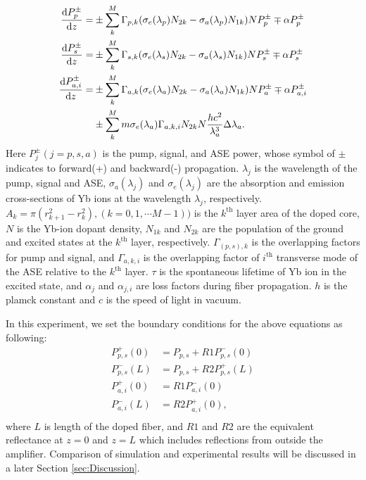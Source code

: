 \documentclass{osa-article}
\begin{document}
\begin{align}
  \dv{P^{\pm}_{p}}{z} = &\pm \sum_{k}^{M} \Gamma_{p, k} (\sigma_{e}(\lambda_{p})N_{2k} - \sigma_{a}(\lambda_{p})N_{1k})NP^{\pm}_{p} \mp \alpha P^{\pm}_{p} \label{eq:PumpPropagationEquation}\\
  \dv{P^{\pm}_{s}}{z} = &\pm \sum_{k}^{M} \Gamma_{s, k} (\sigma_{e}(\lambda_{s})N_{2k} - \sigma_{a}(\lambda_{s})N_{1k})NP^{\pm}_{s} \mp \alpha P^{\pm}_{s} \label{eq:SignalPropagationEquation}\\
  \dv{P^{\pm}_{a, i}}{z} = &\pm \sum_{k}^{M} \Gamma_{a, k} (\sigma_{e}(\lambda_{a})N_{2k} - \sigma_{a}(\lambda_{a})N_{1k})NP^{\pm}_{a} \mp \alpha P^{\pm}_{a, i}\\
  &\pm \sum_{k}^{M} m\sigma_{e}(\lambda_{a})\Gamma_{a, k, i} N_{2k}N \frac{hc^{2}}{\lambda_{a}^{3}} \Delta\lambda_{a}. \label{eq:ASEPropagationEquation}
\end{align}
Here $P^{\pm}_{j} (j = p, s, a)$ is the pump, signal, and ASE power, whose symbol of $\pm$ indicates to forward(+) and backward(-) propagation.
$\lambda_{j}$ is the wavelength of the pump, signal and ASE, $\sigma_{a}(\lambda_{j})$ and $\sigma_{e}(\lambda_{j})$ are the absorption and emission cross-sections of Yb ions at the wavelength $\lambda_{j}$, respectively.
$A_{k} = \pi(r_{k+1}^2 - r_{k}^{2}), (k = 0, 1, \cdots M-1))$ is the $k^{\mathrm{th}}$ layer area of the doped core, $N$ is the Yb-ion dopant density, $N_{1k}$ and $N_{2k}$ are the population of the ground and excited states at the $k^{\mathrm{th}}$ layer, respectively.
$\Gamma_{(p, s), k}$ is the overlapping factors for pump and signal, and $\Gamma_{a, k, i}$ is the overlapping factor of $i^{\mathrm{th}}$ transverse mode of the ASE relative to the $k^{\mathrm{th}}$ layer.
$\tau$ is the spontaneous lifetime of Yb ion in the excited state, and $\alpha_{j}$ and $\alpha_{j, i}$ are loss factors during fiber propagation.
$h$ is the plamck constant and $c$ is the speed of light in vacuum.

In this experiment, we set the boundary conditions for the above equations as following:
\begin{equation}
  \begin{split}
    P_{p, s}^{+}(0) &= P_{p, s} + R1P_{p, s}^{-}(0) \\
    P_{p, s}^{-}(L) &= P_{p, s} + R2P_{p, s}^{+}(L) \\
    P_{a, i}^{+}(0) &= R1P_{a, i}^{-}(0) \\
    P_{a, i}^{-}(L) &= R2P_{a, i}^{+}(0), \\
  \end{split}
\end{equation}
where $L$ is length of the doped fiber, and $R1$ and $R2$ are the equivalent reflectance at $z = 0$ and $z = L$ which includes reflections from outside the amplifier.
Comparison of simulation and experimental results will be discussed in a later Section \ref{sec:Discussion}.
\end{document}
